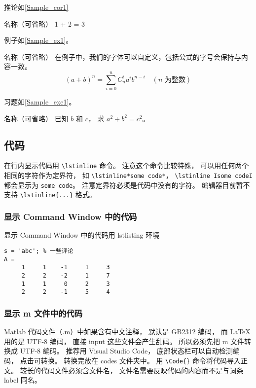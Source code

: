 推论如\autoref{Sample_cor1}
\begin{corollary}{名称（可省略）}\label{Sample_cor1}
1 + 2 = 3
\end{corollary}

例子如\autoref{Sample_ex1}。 
\begin{example}{名称（可省略）}\label{Sample_ex1}
在例子中，我们的字体可以自定义，包括公式的字号会保持与内容一致。
\begin{equation}
(a+b)^n = \sum_{i=0}^n C_n^i a^i b^{n-i} \quad (\text{$n$ 为整数})
\end{equation}
\end{example}

习题如\autoref{Sample_exe1}。 
\begin{exercise}{名称（可省略）}\label{Sample_exe1}
已知 $b$ 和 $c$， 求 $a^2 + b^2 = c^2$。
\end{exercise}

\subsection{代码}
在行内显示代码用 \lstinline|\lstinline| 命令。 注意这个命令比较特殊， 可以用任何两个相同的字符作为定界符， 如 \lstinline|\lstinline*some code*|， \lstinline|\lstinline Isome codeI| 都会显示为 \lstinline|some code|。 注意定界符必须是代码中没有的字符。 编辑器目前暂不支持 \lstinline|\lstinline{...}| 格式。

\subsubsection{显示  Command Window 中的代码}
显示  Command Window 中的代码用 lstlisting 环境
\begin{lstlisting}[language=MatlabCom]
s = 'abc'; % 一些评论
A =
     1     1    -1     1     3
     2     2    -2     1     7
     1     1     0     2     3
     2     2    -1     5     4
\end{lstlisting}

\subsubsection{显示 m 文件中的代码}

Matlab 代码文件（.m）中如果含有中文注释， 默认是 GB2312 编码， 而 LaTeX 用的是 UTF-8 编码， 直接 input 这些文件会产生乱码。 所以必须先把 m 文件转换成 UTF-8 编码。 推荐用 Visual Studio Code， 底部状态栏可以自动检测编码， 点击可转换。 转换完放在 codes 文件夹中。 用 \lstinline|\Code{}| 命令将代码导入正文。 较长的代码文件必须含文件名， 文件名需要反映代码的内容而不是与词条 label 同名。

